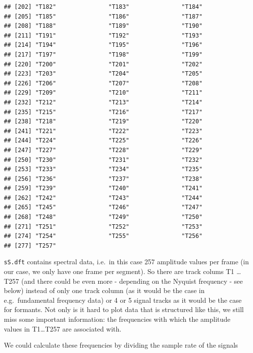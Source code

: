 \documentclass[]{book}
\begin{document}
\begin{verbatim}
## [202] "T182"               "T183"               "T184"              
## [205] "T185"               "T186"               "T187"              
## [208] "T188"               "T189"               "T190"              
## [211] "T191"               "T192"               "T193"              
## [214] "T194"               "T195"               "T196"              
## [217] "T197"               "T198"               "T199"              
## [220] "T200"               "T201"               "T202"              
## [223] "T203"               "T204"               "T205"              
## [226] "T206"               "T207"               "T208"              
## [229] "T209"               "T210"               "T211"              
## [232] "T212"               "T213"               "T214"              
## [235] "T215"               "T216"               "T217"              
## [238] "T218"               "T219"               "T220"              
## [241] "T221"               "T222"               "T223"              
## [244] "T224"               "T225"               "T226"              
## [247] "T227"               "T228"               "T229"              
## [250] "T230"               "T231"               "T232"              
## [253] "T233"               "T234"               "T235"              
## [256] "T236"               "T237"               "T238"              
## [259] "T239"               "T240"               "T241"              
## [262] "T242"               "T243"               "T244"              
## [265] "T245"               "T246"               "T247"              
## [268] "T248"               "T249"               "T250"              
## [271] "T251"               "T252"               "T253"              
## [274] "T254"               "T255"               "T256"              
## [277] "T257"
\end{verbatim}

\texttt{sS.dft} contains spectral data, i.e.~in this case 257 amplitude values per frame (in our case, we only have one frame per segment). So there are track colums T1 \ldots{} T257 (and there could be even more - depending on the Nyquist frequency - see below) instead of only one track column (as it would be the case in e.g.~fundamental frequency data) or 4 or 5 signal tracks as it would be the case for formants. Not only is it hard to plot data that is structured like this, we still miss some important information: the frequencies with which the amplitude values in T1\ldots{}T257 are associated with.

We could calculate these frequencies by dividing the sample rate of the signals
\end{document}
